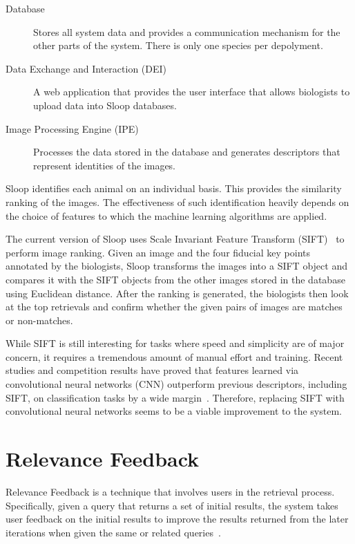   \begin{description}
      \item[Database] Stores all system data and provides a communication
          mechanism for the other parts of the system. There is only one species
          per depolyment.
      \item[Data Exchange and Interaction (DEI)]
      A web application that provides the user interface that allows
      biologists to upload data into Sloop databases.
      \item[Image Processing Engine (IPE)]
      Processes the data stored in the database and generates descriptors
      that represent identities of the images.
  \end{description}

  Sloop identifies each animal on an individual basis. This provides the similarity
  ranking of the images. The effectiveness of such identification heavily
  depends on the choice of features to which the machine learning algorithms are
  applied.

  The current version of Sloop uses Scale Invariant Feature Transform (SIFT)~\cite{lowe04} to
  perform image ranking. Given an image and the four fiducial key points
  annotated by the biologists, Sloop transforms the images into a SIFT object and
  compares it with the SIFT objects from the other images stored in the database using
  Euclidean distance. After the ranking is generated, the biologists then look at
  the top retrievals and confirm whether the given pairs of images are matches or
  non-matches.

  While SIFT is still interesting for tasks where speed and simplicity are of
  major concern, it requires a tremendous amount of manual effort and training.
  Recent studies and competition results have proved that features learned via
  convolutional neural networks (CNN) outperform previous descriptors, including
  SIFT, on classification tasks by a wide margin~\cite{fisher14}. Therefore,
  replacing SIFT with convolutional neural networks seems to be a viable
  improvement to the system.


\section{Relevance Feedback}

Relevance Feedback is a technique that involves users in the retrieval process.
Specifically, given a query that returns a set of initial results, the system
takes user feedback on the initial results to improve the results returned from
the later iterations when given the same or related
queries~\cite{manning2008introduction}.

